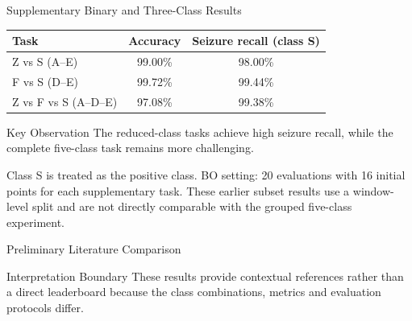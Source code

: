 \documentclass{beamer}
\begin{document}
\begin{frame}{Supplementary Binary and Three-Class Results}
  \begin{table}
    \centering
     \small
    \begin{tabular}{lcc}
      \toprule
      Task & Accuracy & Seizure recall (class S)  \\
      \midrule
      Z vs S (A--E) & 99.00\% & 98.00\% \\
      F vs S (D--E) & 99.72\% & 99.44\% \\
      Z vs F vs S (A--D--E) & 97.08\% & 99.38\% \\
      \bottomrule
    \end{tabular}
  \end{table}

 \begin{block}{Key Observation}
  The reduced-class tasks achieve high seizure recall, while the complete
  five-class task remains more challenging.
\end{block}

\scriptsize
Class S is treated as the positive class. BO setting: 20 evaluations with
16 initial points for each supplementary task. These earlier subset results
use a window-level split and are not directly comparable with the grouped
five-class experiment.
\end{frame}

\begin{frame}{Preliminary Literature Comparison}
  \begin{table}
    \centering
    \scriptsize
  \end{table}

  \begin{block}{Interpretation Boundary}
    These results provide contextual references rather than a direct
    leaderboard because the class combinations, metrics and evaluation
    protocols differ.
  \end{block}
 \end{frame}
\end{document}
